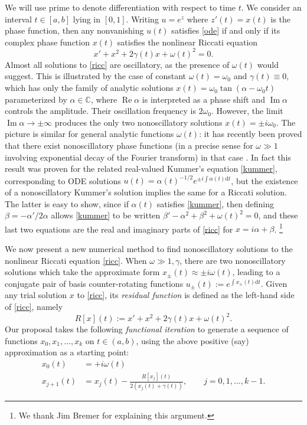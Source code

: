\documentclass[10pt]{article}
\newcommand{\be}{\begin{equation}}
\newcommand{\ee}{\end{equation}}
\newcommand{\ie}{{\it i.e.\ }}
\newcommand{\C}{\mathbb{C}}
\renewcommand{\d}{\mathrm{d}} %
\DeclareMathOperator{\im}{Im}
\DeclareMathOperator{\re}{Re}
\newcommand{\om}{\omega}
\newcommand{\g}{\gamma}
\newcommand{\AB}[1]{{\color{orange}#1}}
\begin{document}
We will use prime to denote differentiation with respect to time $t$.
We consider an interval $t\in[a,b]$ lying in $[0,1]$.  
Writing $u = e^z$ where $z'(t) = x(t)$ is the phase function,
then any nonvanishing $u(t)$ satisfies \cref{ode} if and only if
its complex phase function $x(t)$ satisfies the nonlinear Riccati equation
\be
x' + x^2 + 2\g(t)x + \om(t)^2 = 0.
\label{ricc}
\ee
Almost all solutions to \cref{ricc} are oscillatory,
as the presence of $\om(t)$ would suggest.
This is illustrated by the case of constant $\om(t) = \om_0$
and $\g(t)\equiv 0$,
which has only the family of analytic solutions
$x(t) = \om_0 \tan(\alpha - \om_0t)$ parameterized by $\alpha\in\C$,
where $\re \alpha$ is interpreted as a phase shift and $\im \alpha$
controls the amplitude. Their oscillation frequency is $2\om_0$.
However, the limit $\im \alpha \to \pm \infty$ produces
the only two nonoscillatory solutions $x(t) = \pm i\om_0$.
The picture is similar
for general analytic functions $\om(t)$:
it has recently been proved that there exist nonoscillatory phase functions
(in a precise sense for $\om\gg 1$ involving exponential decay of the Fourier
transform) in that case \cite{heitman2015,bremer2016}.
In fact this result was proven
for the related real-valued Kummer's equation \cref{kummer},
corresponding to ODE solutions $u(t) = \alpha(t)^{-1/2} e^{\pm i\int \alpha(t) \d t}$,
but the existence of a nonoscillatory Kummer's solution implies the same for
a Riccati solution.
The latter is easy to show, since if $\alpha(t)$ satisfies \cref{kummer},
then defining $\beta = -\alpha'/2\alpha$ allows \cref{kummer}
to be written
$\beta' - \alpha^2 + \beta^2 + \om(t)^2 = 0$, and these last two equations
are the real and imaginary parts of \cref{ricc}
for $x = i\alpha + \beta$.
\footnote{We thank Jim Bremer for explaining this argument.}

We now present a new numerical method to find nonoscillatory
solutions to the nonlinear Riccati equation \cref{ricc}.
When $\om\gg 1, \g$, there are two nonoscillatory solutions
which take the approximate form
$x_{\pm}(t) \approx \pm i\om(t)$, leading to a conjugate pair of basis
counter-rotating functions $u_{\pm}(t) := e^{\int x_\pm(t) \d t}$.
Given any trial solution $x$ to \cref{ricc}, its \textit{residual
  function} is defined as the left-hand side of \cref{ricc}, namely
\be
\label{R}
R[x](t) := x' + x^2 + 2\g(t)x + \om(t)^2.
\ee
Our proposal takes the following \textit{functional iteration}
to generate a sequence of functions $x_0, x_1, \dots, x_k$
on $t\in(a,b)$,
using the above positive (say) approximation as a starting point:
\begin{align}
x_0(t) &= +i\om(t)
\label{init}
\\
    x_{j+1}(t) &= x_j(t) - \frac{R[x_j](t)}{2 \left( x_j(t) + \g(t) \right)}, \qquad j=0,1,\dots,k-1.
\label{iter}
\end{align}
\end{document}

